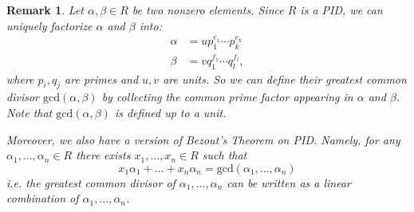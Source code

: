 \documentclass[12pt]{amsbook}
\newtheorem{remark}[theorem]{Remark}
\begin{document}
\begin{remark} \label{rmk-bezout}
    Let $\alpha, \beta \in R$ be two nonzero elements. Since $R$ is a PID, we can uniquely factorize $\alpha$ and $\beta$ into:
    \begin{align*}
        \alpha &= up_1^{e_1}\cdots p_k^{e_k}\\
        \beta &=vq_1^{f_1}\cdots q_l^{f_l},
    \end{align*}
    where $p_i,q_j$ are primes and $u,v$ are units. So we can define their greatest common divisor $\mathrm{gcd}(\alpha,\beta)$ by collecting the common prime factor appearing in $\alpha$ and $\beta$. Note that $\mathrm{gcd}(\alpha,\beta)$ is defined up to a unit.

    Moreover, we also have a version of Bezout's Theorem on PID. Namely, for any $\alpha_1, \dots, \alpha_n \in R$ there exists $x_1, \dots, x_n \in R$ such that
         $$x_1\alpha_1 + \dots + x_n \alpha_n =\mathrm{gcd}(\alpha_1,\dots, \alpha_n)$$
        i.e. the greatest common divisor of $\alpha_1, \dots, \alpha_n$ can be written as a linear combination of $\alpha_1, \dots, \alpha_n$.
\end{remark}
\end{document}
